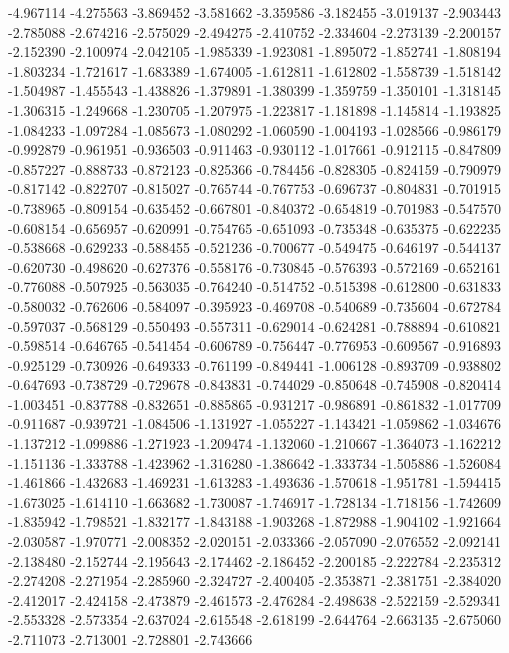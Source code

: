 -4.967114
-4.275563
-3.869452
-3.581662
-3.359586
-3.182455
-3.019137
-2.903443
-2.785088
-2.674216
-2.575029
-2.494275
-2.410752
-2.334604
-2.273139
-2.200157
-2.152390
-2.100974
-2.042105
-1.985339
-1.923081
-1.895072
-1.852741
-1.808194
-1.803234
-1.721617
-1.683389
-1.674005
-1.612811
-1.612802
-1.558739
-1.518142
-1.504987
-1.455543
-1.438826
-1.379891
-1.380399
-1.359759
-1.350101
-1.318145
-1.306315
-1.249668
-1.230705
-1.207975
-1.223817
-1.181898
-1.145814
-1.193825
-1.084233
-1.097284
-1.085673
-1.080292
-1.060590
-1.004193
-1.028566
-0.986179
-0.992879
-0.961951
-0.936503
-0.911463
-0.930112
-1.017661
-0.912115
-0.847809
-0.857227
-0.888733
-0.872123
-0.825366
-0.784456
-0.828305
-0.824159
-0.790979
-0.817142
-0.822707
-0.815027
-0.765744
-0.767753
-0.696737
-0.804831
-0.701915
-0.738965
-0.809154
-0.635452
-0.667801
-0.840372
-0.654819
-0.701983
-0.547570
-0.608154
-0.656957
-0.620991
-0.754765
-0.651093
-0.735348
-0.635375
-0.622235
-0.538668
-0.629233
-0.588455
-0.521236
-0.700677
-0.549475
-0.646197
-0.544137
-0.620730
-0.498620
-0.627376
-0.558176
-0.730845
-0.576393
-0.572169
-0.652161
-0.776088
-0.507925
-0.563035
-0.764240
-0.514752
-0.515398
-0.612800
-0.631833
-0.580032
-0.762606
-0.584097
-0.395923
-0.469708
-0.540689
-0.735604
-0.672784
-0.597037
-0.568129
-0.550493
-0.557311
-0.629014
-0.624281
-0.788894
-0.610821
-0.598514
-0.646765
-0.541454
-0.606789
-0.756447
-0.776953
-0.609567
-0.916893
-0.925129
-0.730926
-0.649333
-0.761199
-0.849441
-1.006128
-0.893709
-0.938802
-0.647693
-0.738729
-0.729678
-0.843831
-0.744029
-0.850648
-0.745908
-0.820414
-1.003451
-0.837788
-0.832651
-0.885865
-0.931217
-0.986891
-0.861832
-1.017709
-0.911687
-0.939721
-1.084506
-1.131927
-1.055227
-1.143421
-1.059862
-1.034676
-1.137212
-1.099886
-1.271923
-1.209474
-1.132060
-1.210667
-1.364073
-1.162212
-1.151136
-1.333788
-1.423962
-1.316280
-1.386642
-1.333734
-1.505886
-1.526084
-1.461866
-1.432683
-1.469231
-1.613283
-1.493636
-1.570618
-1.951781
-1.594415
-1.673025
-1.614110
-1.663682
-1.730087
-1.746917
-1.728134
-1.718156
-1.742609
-1.835942
-1.798521
-1.832177
-1.843188
-1.903268
-1.872988
-1.904102
-1.921664
-2.030587
-1.970771
-2.008352
-2.020151
-2.033366
-2.057090
-2.076552
-2.092141
-2.138480
-2.152744
-2.195643
-2.174462
-2.186452
-2.200185
-2.222784
-2.235312
-2.274208
-2.271954
-2.285960
-2.324727
-2.400405
-2.353871
-2.381751
-2.384020
-2.412017
-2.424158
-2.473879
-2.461573
-2.476284
-2.498638
-2.522159
-2.529341
-2.553328
-2.573354
-2.637024
-2.615548
-2.618199
-2.644764
-2.663135
-2.675060
-2.711073
-2.713001
-2.728801
-2.743666
